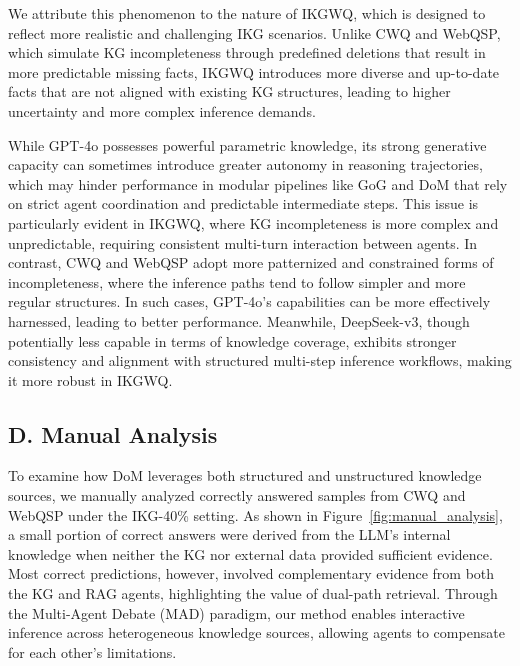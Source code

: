 We attribute this phenomenon to the nature of IKGWQ, which is designed to reflect more realistic and challenging IKG scenarios. Unlike CWQ and WebQSP, which simulate KG incompleteness through predefined deletions that result in more predictable missing facts, IKGWQ introduces more diverse and up-to-date facts that are not aligned with existing KG structures, leading to higher uncertainty and more complex inference demands. 


While GPT-4o possesses powerful parametric knowledge, its strong generative capacity can sometimes introduce greater autonomy in reasoning trajectories, which may hinder performance in modular pipelines like GoG and DoM that rely on strict agent coordination and predictable intermediate steps. This issue is particularly evident in IKGWQ, where KG incompleteness is more complex and unpredictable, requiring consistent multi-turn interaction between agents. In contrast, CWQ and WebQSP adopt more patternized and constrained forms of incompleteness, where the inference paths tend to follow simpler and more regular structures. In such cases, GPT-4o's capabilities can be more effectively harnessed, leading to better performance. Meanwhile, DeepSeek-v3, though potentially less capable in terms of knowledge coverage, exhibits stronger consistency and alignment with structured multi-step inference workflows, making it more robust in IKGWQ.


\subsection{D. Manual Analysis}



To examine how DoM leverages both structured and unstructured knowledge sources, we manually analyzed correctly answered samples from CWQ and WebQSP under the IKG-40\% setting. As shown in Figure~\ref{fig:manual_analysis}, a small portion of correct answers were derived from the LLM’s internal knowledge when neither the KG nor external data provided sufficient evidence. Most correct predictions, however, involved complementary evidence from both the KG and RAG agents, highlighting the value of dual-path retrieval. Through the Multi-Agent Debate (MAD) paradigm, our method enables interactive inference across heterogeneous knowledge sources, allowing agents to compensate for each other’s limitations. 

